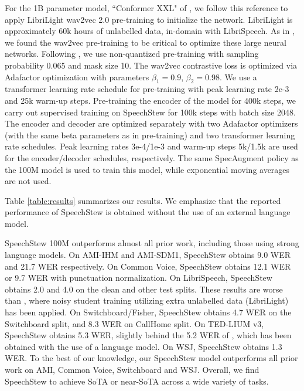 \documentclass[a4paper]{article}
\begin{document}
For the 1B parameter model, ``Conformer XXL" of \cite{zhang-arxiv-2020}, we follow this reference to apply LibriLight wav2vec 2.0 \cite{baevski-arxiv-2020} pre-training to initialize the network. LibriLight \cite{kahn-arxiv-2019} is approximately 60k hours of unlabelled data, in-domain with LibriSpeech. As in \cite{zhang-arxiv-2020}, we found the wav2vec pre-training to be critical to optimize these large neural networks. Following \cite{baevski-arxiv-2020}, we use non-quantized pre-training with sampling probability 0.065 and mask size 10. The wav2vec contrastive loss is optimized via Adafactor optimization \cite{shazeer-icml-2018} with parameters $\beta_1=0.9$, $\beta_2=0.98$. We use a transformer learning rate schedule for pre-training with peak learning rate 2e-3 and 25k warm-up steps. Pre-training the encoder of the model for 400k steps, we carry out supervised training on SpeechStew for 100k steps with batch size 2048. The encoder and decoder are optimized separately with two Adafactor optimizers (with the same beta parameters as in pre-training) and two transformer learning rate schedules. Peak learning rates 3e-4/1e-3 and warm-up steps 5k/1.5k are used for the encoder/decoder schedules, respectively. The same SpecAugment policy as the 100M model is used to train this model, while exponential moving averages are not used.

Table \ref{table:results} summarizes our results. We emphasize that the reported performance of SpeechStew is obtained without the use of an external language model.

SpeechStew 100M outperforms almost all prior work, including those using strong language models. On AMI-IHM and AMI-SDM1, SpeechStew obtains 9.0 WER and 21.7 WER respectively. On Common Voice, SpeechStew obtains 12.1 WER or 9.7 WER with punctuation normalization. On LibriSpeech, SpeechStew obtains 2.0 and 4.0 on the clean and other test splits. These results are worse than \cite{zhang-arxiv-2020}, where noisy student training \cite{park-interspeech-2020} utilizing extra unlabelled data (LibriLight) has been applied.
On Switchboard/Fisher, SpeechStew obtains 4.7 WER on the Switchboard split, and 8.3 WER on CallHome split. On TED-LIUM v3, SpeechStew obtains 5.3 WER, slightly behind the 5.2 WER of \cite{likhomanenko-arxiv-2020}, which has been obtained with the use of a language model. On WSJ, SpeechStew obtains 1.3 WER. To the best of our knowledge, our SpeechStew model outperforms all prior work on AMI, Common Voice, Switchboard and WSJ. Overall, we find SpeechStew to achieve SoTA or near-SoTA across a wide variety of tasks.
\end{document}
